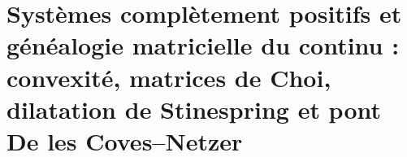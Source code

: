 





\chapter{Systèmes complètement positifs et généalogie matricielle du continu : convexité, matrices de Choi, dilatation de Stinespring et pont De les Coves–Netzer}
\label{chap:sucesor-102-26}
\label{chap:83-22}
\def\HMTGMCOperatorialAPP{1}
\def\HMTGMCDoubleProjection{1}
\def\HMTGMCContinuumMPS{1}
\def\HMTGMCOperatorialTower{1}

\let\HMTGMCOperatorialAPP\undefined
\let\HMTGMCDoubleProjection\undefined
\let\HMTGMCContinuumMPS\undefined
\let\HMTGMCOperatorialTower\undefined

